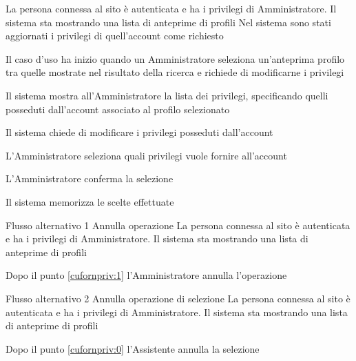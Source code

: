 {}
{La persona connessa al sito è autenticata e ha i privilegi di Amministratore. Il sistema sta mostrando una lista di anteprime di profili}
{Nel sistema sono stati aggiornati i privilegi di quell'account come richiesto}
{\begin{enumCU}
	\item Il caso d'uso ha inizio quando un Amministratore seleziona un'anteprima profilo tra quelle mostrate nel risultato della ricerca e richiede di modificarne i privilegi
	\item Il sistema mostra all'Amministratore la lista dei privilegi, specificando quelli posseduti dall'account associato al profilo selezionato
	\item Il sistema chiede di modificare i privilegi posseduti dall'account
	\item L'Amministratore seleziona quali privilegi vuole fornire all'account\label{cufornpriv:1}
	\item L'Amministratore conferma la selezione
	\item Il sistema memorizza le scelte effettuate
\end{enumCU}}
%
{Flusso alternativo 1}%
{Annulla operazione}%
{La persona connessa al sito è autenticata e ha i privilegi di Amministratore. Il sistema sta mostrando una lista di anteprime di profili}%
{\postNulle}%
{\begin{enumCU}
		\item Dopo il punto \ref{cufornpriv:1} l'Amministratore annulla l'operazione
	\end{enumCU}}%
%	
{Flusso alternativo 2}%
{Annulla operazione di selezione}%
{La persona connessa al sito è autenticata  e ha i privilegi di Amministratore. Il sistema sta mostrando una lista di anteprime di profili}%
{\postNulle}%
{\begin{enumCU}
		\item Dopo il punto \ref{cufornpriv:0} l'Assistente annulla la selezione
\end{enumCU}}%


